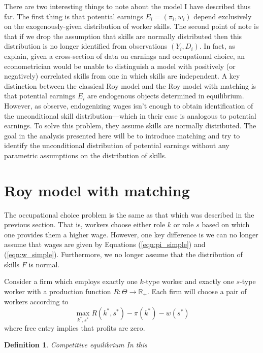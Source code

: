 \documentclass[12 pt]{article}
\newtheorem{definition}{Definition} %
\begin{document}
There are two interesting things to note about the model I have described thus far. The first thing is that potential earnings $E_i = (\pi_i,w_i)$ depend exclusively on the exogenously-given distribution of worker skills. The second point of note is that if we drop the assumption that skills are normally distributed then this distribution is no longer identified from observations $(Y_i,D_i)$. In fact, as \citet{heckman1990empirical} explain, given a cross-section of data on earnings and occupational choice, an econometrician would be unable to distinguish a model with positively (or negatively) correlated skills from one in which skills are independent. A key distinction between the classical Roy model and the Roy model with matching is that potential earnings $E_i$ are endogenous objects determined in equilibrium. However, as \citet{heckman1985heterogeneity} observe, endogenizing wages isn't enough to obtain identification of the unconditional skill distribution---which in their case is analogous to potential earnings. To solve this problem, they assume skills are normally distributed. The goal in the analysis presented here will be to introduce matching and try to identify the unconditional distribution of potential earnings without any parametric assumptions on the distribution of skills.

\section{Roy model with matching}

The occupational choice problem is the same as that which was described in the previous section. That is, workers choose either role $k$ or role $s$ based on which one provides them a higher wage. However, one key difference is we can no longer assume that wages are given by Equations (\ref{eqn:pi_simple}) and (\ref{eqn:w_simple}). Furthermore, we no longer assume that the distribution of skills $F$ is normal.

Consider a firm which employs exactly one $k$-type worker and exactly one $s$-type worker with a production function $R:\Theta \to \mathbb{R}_+$. Each firm will choose a pair of workers according to
\begin{equation}
	\max_{k^*,s^*} R(k^*,s^*) - \pi(k^*) - w(s^*)
	\label{eqn:firm_prob}
\end{equation}
where free entry implies that profits are zero.

\begin{definition}{Competitive equilibrium}
	In this 
\end{definition}




\end{document}
